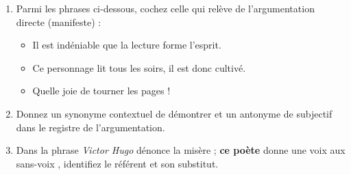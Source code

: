 \documentclass[11pt]{article}
\begin{document}
\begin{exercice}
\begin{enumerate}
    \item Parmi les phrases ci-dessous, cochez celle qui relève de l'argumentation directe (manifeste) :
    \begin{itemize}
        \item[$\square$] \og Il est indéniable que la lecture forme l'esprit. \fg{}
        \item[$\square$] \og Ce personnage lit tous les soirs, il est donc cultivé. \fg{}
        \item[$\square$] \og Quelle joie de tourner les pages ! \fg{}
    \end{itemize}
    \item Donnez un synonyme contextuel de \og démontrer \fg{} et un antonyme de \og subjectif \fg{} dans le registre de l'argumentation.
    \item Dans la phrase \og \textit{Victor Hugo} dénonce la misère ; \textbf{ce poète} donne une voix aux sans-voix \fg{}, identifiez le référent et son substitut.
\end{enumerate}
\end{exercice}
\end{document}
